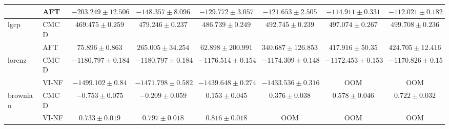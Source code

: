 \begin{table}[!ht]
{\begin{tabular}{l|l|cccccc}
        ~ & AFT &  $-203.249 \pm 12.506$  &  $-148.357 \pm 8.096$  &  $-129.772 \pm 3.057$  &  $-121.653 \pm 2.505$  &  $-114.911 \pm 0.331$  &  $-112.021 \pm 0.182$ \\ 
        \midrule
        lgcp & 
        CMCD &  $469.475 \pm 0.259$ &
$479.246 \pm 0.237$ &
$486.739 \pm 0.249$ &
$492.745 \pm 0.239$ &
$497.074 \pm 0.267$ &
$499.708 \pm 0.236$ \\ 
        ~ & AFT & $75.896 \pm 0.863$  &  $265.005 \pm 34.254$  &  $62.898 \pm 200.991$  &  $340.687 \pm 126.853$  & $417.916 \pm 50.35$  & $424.705 \pm 12.416$ \\ 
        \midrule
        lorenz & 
        CMCD &  $-1180.797 \pm 0.184$ &
$-1180.797 \pm 0.184$ &
$-1176.514 \pm 0.154$ &
$-1174.309 \pm 0.148$ &
$-1172.453 \pm 0.153$ &
$-1170.826 \pm 0.15$ \\ 
        ~ & VI-NF & $-1499.102 \pm 0.84$  &  $-1471.798 \pm 0.582$  &  $-1439.648 \pm 0.274$  &  $-1433.536 \pm 0.316$  &  OOM &  OOM \\ 
        \midrule
        brownian & 
        CMCD &  $-0.753 \pm 0.075$ &
$-0.209 \pm 0.059$ &
$0.153 \pm 0.045$ &
$0.376 \pm 0.038$ &
$0.578 \pm 0.046$ &
$0.722 \pm 0.032$ \\ 
        ~ & VI-NF &  $0.733 \pm 0.019$  & $0.797 \pm 0.018$  & $0.816 \pm 0.018$  &  OOM  &  OOM  &  OOM \\ 
        \bottomrule
    \end{tabular}
    }
\end{table}


